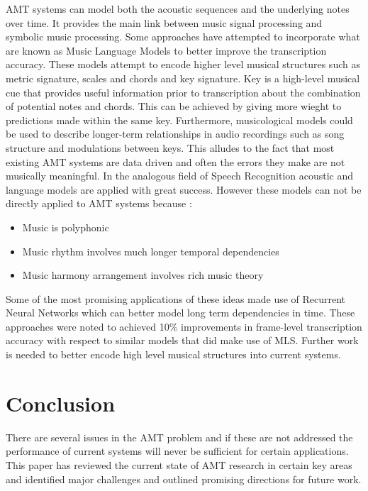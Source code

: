 AMT systems can model both the acoustic sequences and the underlying notes over time.
It provides the main link between music signal processing and symbolic music processing.
Some approaches have attempted to incorporate what are known as Music Language Models to better improve the
transcription accuracy. These models attempt to encode higher level musical structures such as metric signature,
scales and chords and key signature. Key is a high-level musical cue that provides useful information prior
to transcription about the combination of potential notes and chords. This can be achieved by giving more wieght to predictions
made within the same key. Furthermore, musicological models could be used to describe longer-term
relationships in audio recordings such as song structure and modulations between keys. This alludes to the fact that most
existing AMT systems are data driven and often the errors they make are not musically meaningful.
In the analogous field of Speech Recognition acoustic and language models are applied with great success.
However these models can not be directly applied to AMT systems because :
\begin{itemize}
    \item Music is polyphonic
    \item Music rhythm involves much longer temporal dependencies
    \item Music harmony arrangement involves rich music theory
\end{itemize}

Some of the most promising applications of these ideas made use of Recurrent Neural Networks which
can better model long term dependencies in time. These approaches were noted to achieved 10\% improvements in frame-level transcription accuracy with respect to similar models that did
make use of MLS. Further work is needed to better encode high level musical structures into current systems. \cite{amt-note-to-audio:Lewandowski,end-to-end-nn-2016:Sigtia}


\section{Conclusion}
There are several issues in the AMT problem and if these are not addressed the
performance of current systems will never be sufficient for certain
applications. This paper has reviewed the current state of AMT research in
certain key areas and identified major challenges and outlined promising
directions for future work.

